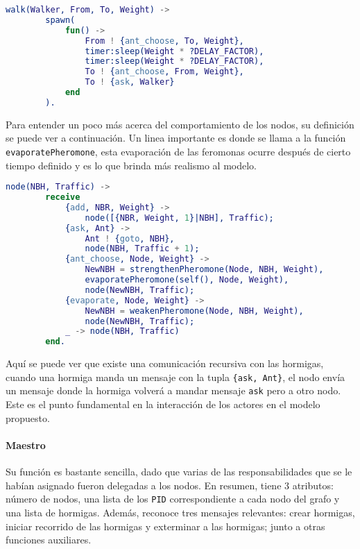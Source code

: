 \documentclass[
12pt, %
letterpaper, %
oneside, %
headinclude,footinclude, %
BCOR5mm, %
]{scrartcl}
\begin{document}
\begin{lstlisting}[language=Erlang]
    walk(Walker, From, To, Weight) ->
        spawn(
            fun() ->
                From ! {ant_choose, To, Weight},
                timer:sleep(Weight * ?DELAY_FACTOR),
                timer:sleep(Weight * ?DELAY_FACTOR),
                To ! {ant_choose, From, Weight},
                To ! {ask, Walker}
            end
        ).
\end{lstlisting}

Para entender un poco más acerca del comportamiento de los nodos, su definición se puede ver a continuación. Un linea importante es donde se llama a la función \texttt{evaporatePheromone}, esta evaporación de las feromonas ocurre después de cierto tiempo definido y es lo que brinda más realismo al modelo.

\begin{lstlisting}[language=Erlang]
    node(NBH, Traffic) ->
        receive
            {add, NBR, Weight} ->
                node([{NBR, Weight, 1}|NBH], Traffic);
            {ask, Ant} ->
                Ant ! {goto, NBH},
                node(NBH, Traffic + 1);
            {ant_choose, Node, Weight} ->
                NewNBH = strengthenPheromone(Node, NBH, Weight),
                evaporatePheromone(self(), Node, Weight),
                node(NewNBH, Traffic);
            {evaporate, Node, Weight} ->
                NewNBH = weakenPheromone(Node, NBH, Weight),
                node(NewNBH, Traffic);
            _ -> node(NBH, Traffic)
        end.
\end{lstlisting}

Aquí se puede ver que existe una comunicación recursiva con las hormigas, cuando una hormiga manda un mensaje con la tupla \texttt{\{ask, Ant\}}, el nodo envía un mensaje donde la hormiga volverá a mandar mensaje \texttt{ask} pero a otro nodo. Este es el punto fundamental en la interacción de los actores en el modelo propuesto.

\paragraph{Maestro}

Su función es bastante sencilla, dado que varias de las responsabilidades que se le habían asignado fueron delegadas a los nodos. En resumen, tiene 3 atributos: número de nodos, una lista de los \texttt{PID} correspondiente a cada nodo del grafo y una lista de hormigas. Además, reconoce tres mensajes relevantes: crear hormigas, iniciar recorrido de las hormigas y exterminar a las hormigas; junto a otras funciones auxiliares.
\end{document}
